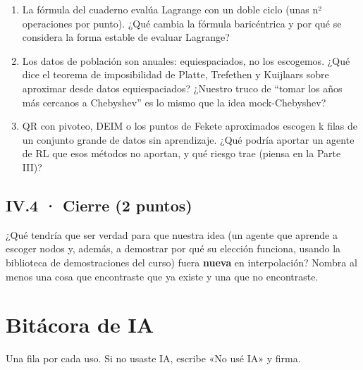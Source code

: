 \begin{enumerate}
\def\labelenumi{\arabic{enumi}.}
\tightlist
\item
  La fórmula del cuaderno evalúa Lagrange con un doble ciclo (unas n² operaciones por punto). ¿Qué cambia la fórmula baricéntrica y por qué se considera la forma estable de evaluar Lagrange?
\item
  Los datos de población son anuales: equiespaciados, no los escogemos. ¿Qué dice el teorema de imposibilidad de Platte, Trefethen y Kuijlaars sobre aproximar desde datos equiespaciados? ¿Nuestro truco de ``tomar los años más cercanos a Chebyshev'' es lo mismo que la idea mock-Chebyshev?
\item
  QR con pivoteo, DEIM o los puntos de Fekete aproximados escogen k filas de un conjunto grande de datos sin aprendizaje. ¿Qué podría aportar un agente de RL que esos métodos no aportan, y qué riesgo trae (piensa en la Parte III)?
\end{enumerate}

\subsection{IV.4 · Cierre (2 puntos)}

¿Qué tendría que ser verdad para que nuestra idea (un agente que aprende a escoger nodos y, además, a demostrar por qué su elección funciona, usando la biblioteca de demostraciones del curso) fuera \textbf{nueva} en interpolación? Nombra al menos una cosa que encontraste que ya existe y una que no encontraste.

\section{Bitácora de IA}

Una fila por cada uso. Si no usaste IA, escribe «No usé IA» y firma.

